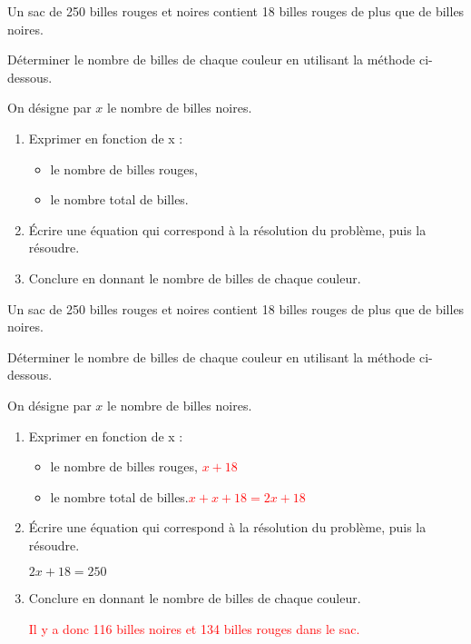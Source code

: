 \begin{exercice*}
    Un sac de 250 billes rouges et noires contient 18 billes rouges de plus que de billes noires.

    Déterminer le nombre de billes de chaque couleur en utilisant la méthode ci-dessous.

    On désigne par $x$ le nombre de billes noires.
    \begin{enumerate}
        \item Exprimer en fonction de x :
        \begin{itemize}
            \item le nombre de billes rouges,
            \item le nombre total de billes.
        \end{itemize}
            \item Écrire une équation qui correspond à la résolution du problème, puis la résoudre.
            \item Conclure en donnant le nombre de billes de chaque couleur.
    \end{enumerate}
\end{exercice*}
\begin{corrige}
    Un sac de 250 billes rouges et noires contient 18 billes rouges de plus que de billes noires.

    Déterminer le nombre de billes de chaque couleur en utilisant la méthode ci-dessous.

    On désigne par $x$ le nombre de billes noires.
    \begin{enumerate}
        \item Exprimer en fonction de x : 
        \begin{itemize}
            \item le nombre de billes rouges, \textcolor{red}{$x+18$}
            \item le nombre total de billes.\textcolor{red}{$x+x+18=2x+18$}
        \end{itemize}
            \item Écrire une équation qui correspond à la résolution du problème, puis la résoudre. 
            
            {\color{red}$2x+18=250$

            }
            \item Conclure en donnant le nombre de billes de chaque couleur.
            
            \textcolor{red}{Il y a donc 116 billes noires et 134 billes rouges dans le sac.}
    \end{enumerate}
\end{corrige}

